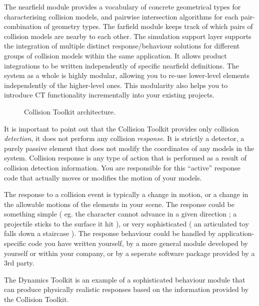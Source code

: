 \documentclass[11pt]{article}
\begin{document}
The nearfield module provides a vocabulary of concrete geometrical types for
characterising collision models, and pairwise intersection algorithms for
each pair-combination of geometry types.
The farfield module keeps track of which pairs of collision models are
nearby to each other.
The simulation support layer 
supports the integration of
multiple distinct response/behaviour solutions for different groups of
collision models within the same application. 
It allows product
integrations to be written independently of specific nearfield definitions.
The system as a whole is highly modular, allowing you to re-use
lower-level elements independently of the higher-level ones. This
modularity also helps you to introduce CT functionality incrementally into
your existing projects.


\begin{figure}
\centerline{}
\caption{ Collision Toolkit architecture. 
} 
\label{fig:arch}
\end{figure}



It is important to point out that the Collision Toolkit provides only collision
\emph{detection}, it does not perform any collision \emph{response}.  It is
strictly a detector, a purely passive element that does not modify the
coordinates of any models in the system.  Collision response is any type of
action that is performed as a result of collision detection information.
You are responsible for this ``active'' response code that actually moves or modifies the motion of your models.

The response to a collision event is typically a change in motion, or a change in the allowable
motions of the elements in your scene. The response could be something
simple ( eg. the character cannot advance in a given direction ; a projectile
sticks to the surface it hit ), or very sophisticated ( an articulated toy
falls down a staircase ). 
The response behaviour could be handled
by application-specific code you have written yourself,
by a more general module developed by yourself or within your company, 
or by a seperate software package provided by a 3rd party.

The Dynamics Toolkit is an example of a sophisticated behaviour module that can produce
physically realistic responses based on the information provided by the Collision Toolkit.
\end{document}
